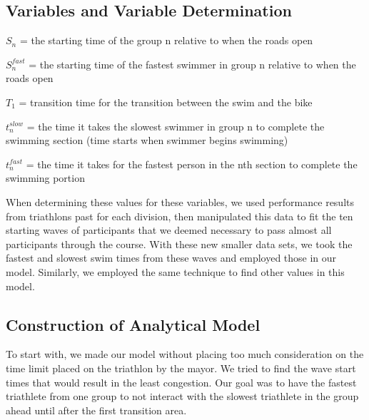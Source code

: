 \documentclass[12pt]{article}
\begin{document}
\subsection{Variables and Variable Determination}
\(S_{n}\) = the starting time of the group n relative to when the roads open\vspace{2ex} \par \noindent 
\(S_n^{fast}\) = the starting time of the fastest swimmer in group n relative to when the roads open\vspace{2ex} \par \noindent 
\(T_1\) = transition time for the transition between the swim and the bike\vspace{2ex} \par \noindent
\(t_n^{slow}\) = the time it takes the slowest swimmer in group n to complete the swimming section (time starts when swimmer begins swimming)\vspace{2ex} \par \noindent
\(t_n^{fast}\) = the time it takes for the fastest person in the nth section to complete the swimming portion\par \vspace{2ex}

When determining these values for these variables, we used performance results from triathlons past for each division, then manipulated this data to fit the ten starting waves of participants that we deemed necessary to pass almost all participants through the course. With these new smaller data sets, we took the fastest and slowest swim times from these waves and employed those in our model. Similarly, we employed the same technique to find other values in this model. 
\subsection{Construction of Analytical Model}
To start with, we made our model without placing too much consideration on the time limit placed on the triathlon by the mayor. We tried to find the wave start times that would result in the least congestion. Our goal was to have the fastest triathlete from one group to not interact with the slowest triathlete in the group ahead until after the first transition area.
\end{document}
